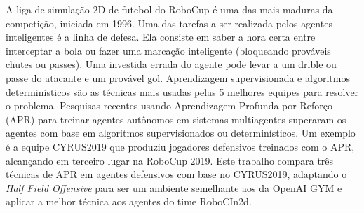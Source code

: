 A liga de simulação 2D de futebol do RoboCup é uma das mais maduras da competição, iniciada em 1996. Uma das tarefas a ser realizada pelos agentes inteligentes é a linha de defesa. Ela consiste em saber a hora certa entre interceptar a bola ou fazer uma marcação inteligente (bloqueando prováveis chutes ou passes). Uma investida errada do agente pode levar a um drible ou passe do atacante e um provável gol. Aprendizagem supervisionada e algoritmos determinísticos são as técnicas mais usadas pelas 5 melhores equipes para resolver o problema. Pesquisas recentes usando Aprendizagem Profunda por Reforço (APR) para treinar agentes autônomos em sistemas multiagentes superaram os agentes com base em algoritmos supervisionados ou determinísticos. Um exemplo é a equipe CYRUS2019 que produziu jogadores defensivos treinados com o APR, alcançando em terceiro lugar na RoboCup 2019. Este trabalho compara três técnicas de APR em agentes defensivos com base no CYRUS2019, adaptando o \textit{Half Field Offensive} para ser um ambiente semelhante aos da OpenAI GYM e aplicar a melhor técnica aos agentes do time RoboCIn2d.